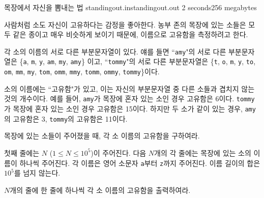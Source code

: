 \begin{problem}{목장에서 자신을 뽐내는 법}
	{standingout.in}{standingout.out}
	{2 seconds}{256 megabytes}{}
	
	사람처럼 소도 자신이 고유하다는 감정을 좋아한다. 농부 존의 목장에 있는 소들은 모두 같은 종이고 매우 비슷하게 보이기 때문에, 이름으로 고유함을 측정하려고 한다.
	
	각 소의 이름의 서로 다른 부분문자열이 있다. 얘를 들면 ``\texttt{amy}"의 서로 다른 부분문자열은 \{\texttt{a}, \texttt{m}, \texttt{y}, \texttt{am}, \texttt{my}, \texttt{amy}\} 이고, ``\texttt{tommy}"의 서로 다른 부분문자열은 \{\texttt{t}, \texttt{o}, \texttt{m}, \texttt{y}, \texttt{to}, \texttt{om}, \texttt{mm}, \texttt{my}, \texttt{tom}, \texttt{omm}, \texttt{mmy}, \texttt{tomm}, \texttt{ommy}, \texttt{tommy}\}이다.
	
	소의 이름에는 ``고유함"가 있고, 이는 자신의 부분문자열 중 다른 소들과 겹치지 않는 것의 개수이다. 예를 들어, \texttt{amy}가 목장에 혼자 있는 소인 경우 고유함은 6이다. \texttt{tommy}가 목장에 혼자 있는 소인 경우 고유함은 15이다. 하지만 두 소가 같이 있는 경우, \texttt{amy}의 고유함은 3, \texttt{tommy}의 고유함은 11이다.
	
	목장에 있는 소들이 주어졌을 때, 각 소 이름의 고유함을 구하여라.
	
	\InputFile
	
	첫째 줄에는 $N$ ($1 \le N \le 10^5$)이 주어진다. 다음 $N$개의 각 줄에는 목장에 있는 소의 이름이 하나씩 주어진다. 각 이름은 영어 소문자 \texttt{a}부터 \texttt{z}까지 주어진다. 이름 길이의 합은 $10^5$를 넘지 않는다. 

	\OutputFile
	
	$N$개의 줄에 한 줄에 하나씩 각 소 이름의 고유함을 출력하여라.
	
	\Examples
		
	\begin{example}
	\end{example}

	
	
	
\end{problem}

